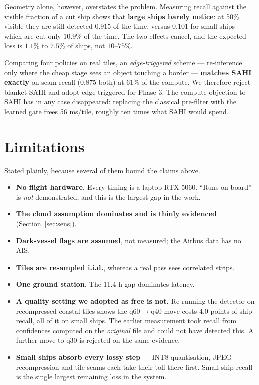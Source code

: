 \documentclass[10pt,a4paper]{article}
\begin{document}
Geometry alone, however, overstates the problem. Measuring recall against the visible fraction of
a cut ship shows that \textbf{large ships barely notice}: at 50\% visible they are still detected
$0.915$ of the time, versus $0.101$ for small ships --- which are cut only $10.9\%$ of the time.
The two effects cancel, and the expected loss is $1.1\%$ to $7.5\%$ of ships, not $10$--$75\%$.

Comparing four policies on real tiles, an \emph{edge-triggered} scheme --- re-inference only where
the cheap stage sees an object touching a border --- \textbf{matches SAHI exactly} on seam recall
($0.875$ both) at $61\%$ of the compute. We therefore reject blanket SAHI and adopt edge-triggered
for Phase 3. The compute objection to SAHI has in any case disappeared: replacing the classical
pre-filter with the learned gate frees 56 ms/tile, roughly ten times what SAHI would spend.

\section{Limitations}\label{sec:limits}

Stated plainly, because several of them bound the claims above.

\begin{itemize}
\item \textbf{No flight hardware.} Every timing is a laptop RTX 5060. ``Runs on board'' is
  \emph{not} demonstrated, and this is the largest gap in the work.
\item \textbf{The cloud assumption dominates and is thinly evidenced} (Section~\ref{sec:sens}).
\item \textbf{Dark-vessel flags are assumed}, not measured; the Airbus data has no AIS.
\item \textbf{Tiles are resampled i.i.d.}, whereas a real pass sees correlated strips.
\item \textbf{One ground station.} The 11.4 h gap dominates latency.
\item \textbf{A quality setting we adopted as free is not.} Re-running the detector on
  recompressed coastal tiles shows the q60$\to$q40 move costs $4.0$ points of ship recall, all of
  it on small ships. The earlier measurement took recall from confidences computed on the
  \emph{original} file and could not have detected this. A further move to q30 is rejected on the
  same evidence.
\item \textbf{Small ships absorb every lossy step} --- INT8 quantisation, JPEG recompression and
  tile seams each take their toll there first. Small-ship recall is the single largest remaining
  loss in the system.
\end{itemize}
\end{document}
